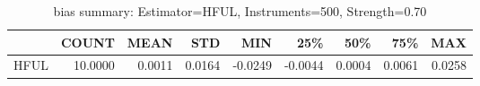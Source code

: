 \begin{table}[ht]
\centering
\caption{bias summary: Estimator=HFUL, Instruments=500, Strength=0.70}
\begin{tabular}{lrrrrrrrr}
\toprule
 & COUNT & MEAN & STD & MIN & 25\% & 50\% & 75\% & MAX \\
\midrule
HFUL & 10.0000 & 0.0011 & 0.0164 & -0.0249 & -0.0044 & 0.0004 & 0.0061 & 0.0258 \\
\bottomrule
\end{tabular}
\end{table}
